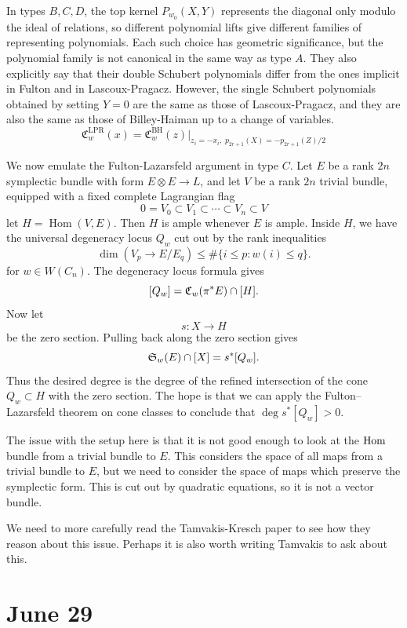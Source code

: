 \documentclass[12pt]{article}
\begin{document}
In types $B,C,D$, the top kernel $P_{w_0}(X,Y)$ represents the diagonal only modulo the ideal of relations, so different polynomial lifts give different families of representing polynomials. Each such choice has geometric significance, but the polynomial family is not canonical in the same way as type $A$. They also explicitly say that their double Schubert polynomials differ from the ones implicit in Fulton and in Lascoux-Pragacz. However, the single Schubert polynomials obtained by setting $Y=0$ are the same as those of Lascoux-Pragacz, and they are also the same as those of Billey-Haiman up to a change of variables. \[
    \mathfrak C_w^{\mathrm{LPR}}(x)
    =
    \mathfrak C_w^{\mathrm{BH}}(z)\big|_{z_i=-x_i,\; p_{2r+1}(X)=-p_{2r+1}(Z)/2}\]

We now emulate the Fulton-Lazarsfeld argument in type $C$. Let $E$ be a rank $2n$ symplectic bundle with form $E\otimes E\to L$, and let $V$ be a rank $2n$ trivial bundle, equipped with a fixed complete Lagrangian flag \[
    0 = V_0\subset V_1\subset\cdots\subset V_n \subset V\]
let $H=\operatorname{Hom}(V,E)$. Then $H$ is ample whenever $E$ is ample. Inside $H$, we have the universal degeneracy locus $Q_w$ cut out by the rank inequalities
\[
    \dim(V_p \to E/E_q) \leq \#\{i\leq p: w(i)\leq q\}.
\] for $w\in W(C_n)$. The degeneracy locus formula gives
\[
    [Q_w]
    =
    \mathfrak{C}_w(\pi^*E)\cap [H].
\]
Now let
\[
    s:X\longrightarrow H
\]
be the zero section. Pulling back along the zero section gives
\[
    \mathfrak{S}_w(E)\cap [X]
    =
    s^*[Q_w].
\]
Thus the desired degree is the degree of the refined intersection of the cone $Q_w\subset H$ with the zero section. The hope is that we can apply the Fulton--Lazarsfeld theorem on cone classes to conclude that $\deg s^*[Q_w]>0$.

The issue with the setup here is that it is not good enough to look at the $\operatorname{Hom}$ bundle from a trivial bundle to $E$. This considers the space of all maps from a trivial bundle to $E$, but we need to consider the space of maps which preserve the symplectic form. This is cut out by quadratic equations, so it is not a vector bundle.

We need to more carefully read the Tamvakis-Kresch paper to see how they reason about this issue. Perhaps it is also worth writing Tamvakis to ask about this.

\section{June 29}
\end{document}
